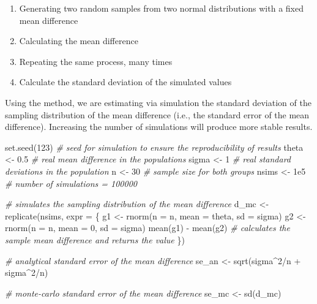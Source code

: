 \documentclass[
  man,floatsintext]{apa6}
\newenvironment{Shaded}{\begin{snugshade}}{\end{snugshade}}
\newcommand{\AttributeTok}[1]{\textcolor[rgb]{0.77,0.63,0.00}{#1}}
\newcommand{\CommentTok}[1]{\textcolor[rgb]{0.56,0.35,0.01}{\textit{#1}}}
\newcommand{\DecValTok}[1]{\textcolor[rgb]{0.00,0.00,0.81}{#1}}
\newcommand{\FloatTok}[1]{\textcolor[rgb]{0.00,0.00,0.81}{#1}}
\newcommand{\FunctionTok}[1]{\textcolor[rgb]{0.00,0.00,0.00}{#1}}
\newcommand{\NormalTok}[1]{#1}
\newcommand{\OtherTok}[1]{\textcolor[rgb]{0.56,0.35,0.01}{#1}}
\newcommand{\SpecialCharTok}[1]{\textcolor[rgb]{0.00,0.00,0.00}{#1}}
\providecommand{\tightlist}{%
  \setlength{\itemsep}{0pt}\setlength{\parskip}{0pt}}
\begin{document}
\begin{enumerate}
\def\labelenumi{\arabic{enumi}.}
\tightlist
\item
  Generating two random samples from two normal distributions with a fixed mean difference
\item
  Calculating the mean difference
\item
  Repeating the same process, many times
\item
  Calculate the standard deviation of the simulated values
\end{enumerate}

Using the method, we are estimating via simulation the standard deviation of the sampling distribution of the mean difference (i.e., the standard error of the mean difference). Increasing the number of simulations will produce more stable results.

\scriptsize

\begin{Shaded}
\begin{Highlighting}[]
\FunctionTok{set.seed}\NormalTok{(}\DecValTok{123}\NormalTok{) }\CommentTok{\# seed for simulation to ensure the reproducibility of results}
\NormalTok{theta }\OtherTok{\textless{}{-}} \FloatTok{0.5} \CommentTok{\# real mean difference in the populations}
\NormalTok{sigma }\OtherTok{\textless{}{-}} \DecValTok{1} \CommentTok{\# real standard deviations in the population}
\NormalTok{n }\OtherTok{\textless{}{-}} \DecValTok{30} \CommentTok{\# sample size for both groups}
\NormalTok{nsims }\OtherTok{\textless{}{-}} \FloatTok{1e5} \CommentTok{\# number of simulations = 100000}

\CommentTok{\# simulates the sampling distribution of the mean difference}
\NormalTok{d\_mc }\OtherTok{\textless{}{-}} \FunctionTok{replicate}\NormalTok{(nsims, }\AttributeTok{expr =}\NormalTok{ \{}
\NormalTok{  g1 }\OtherTok{\textless{}{-}} \FunctionTok{rnorm}\NormalTok{(}\AttributeTok{n =}\NormalTok{ n, }\AttributeTok{mean =}\NormalTok{ theta, }\AttributeTok{sd =}\NormalTok{ sigma)}
\NormalTok{  g2 }\OtherTok{\textless{}{-}} \FunctionTok{rnorm}\NormalTok{(}\AttributeTok{n =}\NormalTok{ n, }\AttributeTok{mean =} \DecValTok{0}\NormalTok{, }\AttributeTok{sd =}\NormalTok{ sigma)}
  \FunctionTok{mean}\NormalTok{(g1) }\SpecialCharTok{{-}} \FunctionTok{mean}\NormalTok{(g2) }\CommentTok{\# calculates the sample mean difference and returns the value}
\NormalTok{\})}

\CommentTok{\# analytical standard error of the mean difference}
\NormalTok{se\_an }\OtherTok{\textless{}{-}} \FunctionTok{sqrt}\NormalTok{(sigma}\SpecialCharTok{\^{}}\DecValTok{2}\SpecialCharTok{/}\NormalTok{n }\SpecialCharTok{+}\NormalTok{ sigma}\SpecialCharTok{\^{}}\DecValTok{2}\SpecialCharTok{/}\NormalTok{n)}

\CommentTok{\# monte{-}carlo standard error of the mean difference}
\NormalTok{se\_mc }\OtherTok{\textless{}{-}} \FunctionTok{sd}\NormalTok{(d\_mc)}
\end{Highlighting}
\end{Shaded}
\end{document}
